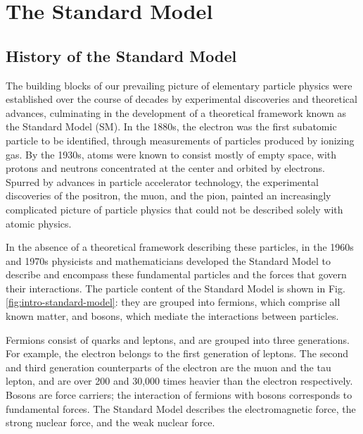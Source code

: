 \documentclass{article}
\begin{document}
\section{The Standard Model}

\subsection{History of the Standard Model}
The building blocks of our prevailing picture of elementary particle physics were established over the course of decades by experimental discoveries and theoretical advances, culminating in the development of a theoretical framework known as the Standard Model (SM). In the 1880s, the electron was the first subatomic particle to be identified, through measurements of particles produced by ionizing gas. By the 1930s, atoms were known to consist mostly of empty space, with protons and neutrons concentrated at the center and orbited by electrons. Spurred by advances in particle accelerator technology, the experimental discoveries of the positron, the muon, and the pion, painted an increasingly complicated picture of particle physics that could not be described solely with atomic physics.

In the absence of a theoretical framework describing these particles, in the 1960s and 1970s physicists and mathematicians developed the Standard Model to describe and encompass these fundamental particles and the forces that govern their interactions. The particle content of the Standard Model is shown in Fig. \ref{fig:intro-standard-model}: they are grouped into fermions, which comprise all known matter, and bosons, which mediate the interactions between particles.

Fermions consist of quarks and leptons, and are grouped into three generations. For example, the electron belongs to the first generation of leptons. The second and third generation counterparts of the electron are the muon and the tau lepton, and are over 200 and 30,000 times heavier than the electron respectively. Bosons are force carriers; the interaction of fermions with bosons corresponds to fundamental forces. The Standard Model describes the electromagnetic force, the strong nuclear force, and the weak nuclear force.
\end{document}
